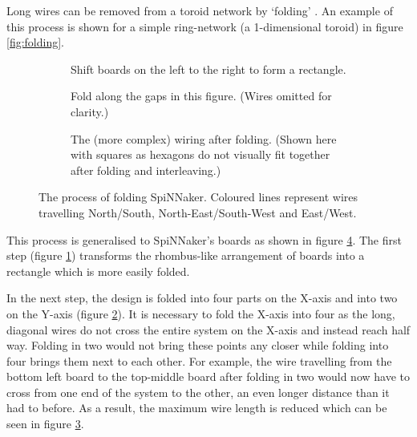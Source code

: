 			Long wires can be removed from a toroid network by `folding'
			\cite{dally04}. An example of this process is shown for a simple
			ring-network (a 1-dimensional toroid) in figure \ref{fig:folding}.
			
			\begin{figure}
				\center
				\begin{subfigure}[b]{\textwidth}
					\center
					
					\caption{Shift boards on the left to the right to form a rectangle.}
					\label{fig:boardsFoldedShift}
				\end{subfigure}
				
				\vspace{2ex}
				
				\begin{subfigure}[b]{\textwidth}
					\center
					
					\caption{Fold along the gaps in this figure. (Wires omitted for
					clarity.)}
					\label{fig:boardsFoldedSpaced}
				\end{subfigure}
				
				\vspace{2ex}
				
				\begin{subfigure}[b]{\textwidth}
					\center
					
					\caption{The (more complex) wiring after folding. (Shown here with
					squares as hexagons do not visually fit together after folding and
					interleaving.)}
					\label{fig:boardsFoldedInterleaved}
				\end{subfigure}
				
				\caption[Folding SpiNNaker.]{The process of folding SpiNNaker. Coloured
				lines represent wires travelling {\color{red}North/South},
				{\color{green}North-East/South-West} and {\color{blue}East/West}.}
				\label{fig:boardsFolded}
			\end{figure}
			
			This process is generalised to SpiNNaker's boards as shown in figure
			\ref{fig:boardsFolded}. The first step (figure
			\ref{fig:boardsFoldedShift}) transforms the rhombus-like arrangement of
			boards into a rectangle which is more easily folded.
			
			In the next step, the design is folded into four parts on the X-axis and
			into two on the Y-axis (figure \ref{fig:boardsFoldedSpaced}). It is
			necessary to fold the X-axis into four as the long, diagonal wires do not
			cross the entire system on the X-axis and instead reach half way. Folding
			in two would not bring these points any closer while folding into four
			brings them next to each other. For example, the wire travelling from the
			bottom left board to the top-middle board after folding in two would now
			have to cross from one end of the system to the other, an even longer
			distance than it had to before. As a result, the maximum wire length is
			reduced which can be seen in figure \ref{fig:boardsFoldedInterleaved}.
			
